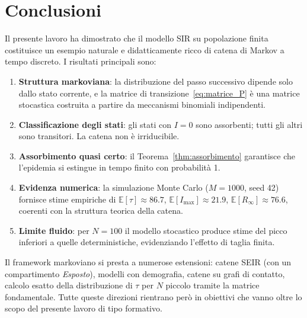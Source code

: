 \documentclass[11pt, a4paper]{article}
\theoremstyle{plain}
\theoremstyle{definition}
\theoremstyle{remark}
\newcommand{\E}{\mathbb{E}}
\begin{document}
\section{Conclusioni}
\label{sec:conclusioni}

Il presente lavoro ha dimostrato che il modello SIR su popolazione finita costituisce
un esempio naturale e didatticamente ricco di catena di Markov a tempo discreto.
I risultati principali sono:

\begin{enumerate}[label=(\roman*)]
  \item \textbf{Struttura markoviana}: la distribuzione del passo successivo dipende
        solo dallo stato corrente, e la matrice di transizione~\eqref{eq:matrice_P}
        è una matrice stocastica costruita a partire da meccanismi binomiali indipendenti.
  \item \textbf{Classificazione degli stati}: gli stati con $I = 0$ sono assorbenti;
        tutti gli altri sono transitori. La catena non è irriducibile.
  \item \textbf{Assorbimento quasi certo}: il Teorema~\ref{thm:assorbimento} garantisce
        che l'epidemia si estingue in tempo finito con probabilità 1.
  \item \textbf{Evidenza numerica}: la simulazione Monte Carlo ($M = 1000$, seed 42)
        fornisce stime empiriche di $\E[\tau] \approx 86.7$, $\E[I_{\max}] \approx 21.9$,
        $\E[R_\infty] \approx 76.6$, coerenti con la struttura teorica della catena.
  \item \textbf{Limite fluido}: per $N = 100$ il modello stocastico produce stime del
        picco inferiori a quelle deterministiche, evidenziando l'effetto di taglia finita.
\end{enumerate}

Il framework markoviano si presta a numerose estensioni: catene SEIR (con un
compartimento \emph{Esposto}), modelli con demografia, catene su grafi di contatto,
calcolo esatto della distribuzione di $\tau$ per $N$ piccolo tramite la matrice fondamentale.
Tutte queste direzioni rientrano però in obiettivi che vanno oltre lo scopo del presente
lavoro di tipo formativo.
\end{document}
